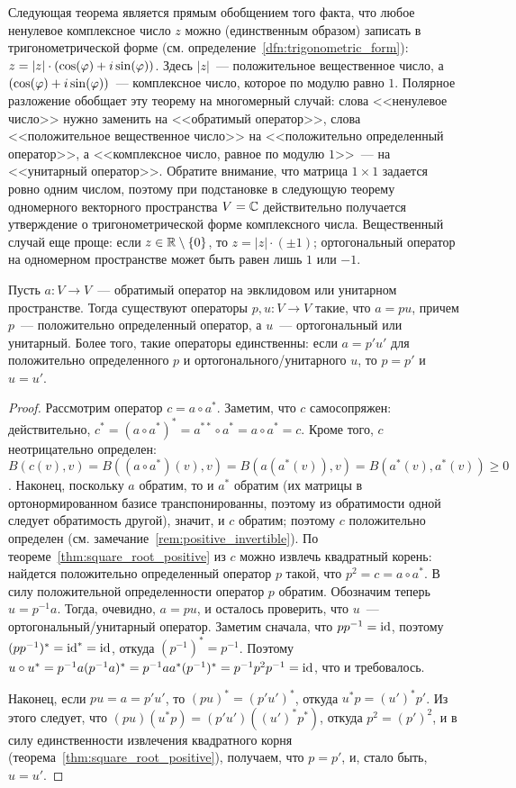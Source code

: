 Следующая теорема является прямым обобщением того факта, что
любое ненулевое комплексное число $z$ можно (единственным образом)
записать в
тригонометрической форме
(см. определение~\ref{dfn:trigonometric_form}):
$z = |z|\cdot (\cos(\varphi)+i\sin(\varphi))$.
Здесь
$|z|$~--- положительное вещественное число, а $(\cos(\varphi) +
i\sin(\varphi))$~--- комплексное число, которое по модулю равно
$1$. Полярное разложение обобщает эту теорему на многомерный случай:
слова <<ненулевое число>> нужно заменить на <<обратимый оператор>>,
слова <<положительное вещественное число>> на <<положительно
определенный оператор>>, а <<комплексное число, равное по модулю
$1$>>~--- на <<унитарный оператор>>. Обратите внимание, что матрица
$1\times 1$ задается ровно одним числом, поэтому при подстановке в
следующую теорему одномерного векторного пространства $V=\mathbb C$
действительно получается утверждение о тригонометрической форме
комплексного числа. Вещественный случай еще проще: если
$z\in\mathbb R\setminus\{0\}$, то $z = |z|\cdot(\pm 1)$; ортогональный
оператор на одномерном пространстве может быть равен лишь $1$ или
$-1$.

\begin{theorem}\label{thm:polar_decomposition}
Пусть $a\colon V\to V$~--- обратимый оператор на эвклидовом или
унитарном пространстве. Тогда существуют операторы $p,u\colon V\to V$
такие, что $a = pu$, причем $p$~--- положительно определенный
оператор, а $u$~--- ортогональный или унитарный. Более того, такие
операторы единственны: если $a=p'u'$ для положительно определенного
$p$ и ортогонального/унитарного $u$, то $p=p'$ и $u=u'$.
\end{theorem}
\begin{proof}
Рассмотрим оператор $c = a\circ a^*$. Заметим, что $c$ самосопряжен:
действительно, $c^* = (a\circ a^*)^* = a^{**}\circ a^* = a\circ a^* =
c$.
Кроме того, $c$ неотрицательно определен:
$B(c(v),v) = B((a\circ a^*)(v),v) = B(a(a^*(v)),v) =
B(a^*(v),a^*(v))\geq 0$.
Наконец, поскольку $a$ обратим, то и $a^*$ обратим (их матрицы в
ортонормированном базисе транспонированны, поэтому из обратимости
одной следует обратимость другой), значит, и $c$ обратим; поэтому $c$
положительно определен (см. замечание~\ref{rem:positive_invertible}).
По теореме~\ref{thm:square_root_positive} из $c$ можно извлечь
квадратный корень: найдется положительно определенный оператор $p$
такой, что $p^2 = c = a\circ a^*$. В силу положительной определенности
оператор $p$ обратим.
Обозначим теперь $u = p^{-1}a$. Тогда, очевидно, $a = pu$, и осталось
проверить, что $u$~--- ортогональный/унитарный оператор.
Заметим сначала, что $pp^{-1} = \operatorname{id}$, поэтому
$(pp^{-1})^* = \operatorname{id}^* = \operatorname{id}$, откуда $(p^{-1})^* = p^{-1}$.
Поэтому $u\circ u^* = p^{-1}a(p^{-1}a)^* = p^{-1}aa^*(p^{-1})^* =
p^{-1}p^2 p^{-1} = \operatorname{id}$, что и требовалось.

Наконец, если $pu = a = p'u'$, то $(pu)^* = (p'u')^*$, откуда $u^* p =
(u')^*p'$. Из этого следует, что
$(pu)(u^*p) = (p'u')((u')^*p^*)$, откуда $p^2 = (p')^2$, и в силу
единственности извлечения квадратного корня
(теорема~\ref{thm:square_root_positive}), получаем, что
$p=p'$, и, стало быть, $u=u'$.
\end{proof}

